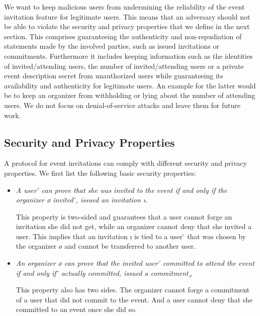 We want to keep malicious users from undermining the reliability of the
event invitation feature for legitimate users. This means that an
adversary should not be able to violate the security and privacy
properties that we define in the next section. 
This comprises guaranteeing the authenticity and non-repudiation of
statements made by the involved parties, such as issued invitations or
commitments. 
Furthermore it includes keeping information such as the identities of
invited/attending users, the number of invited/attending users or a
private event description secret from unauthorized users while
guaranteeing its availability and authenticity for legitimate users.
An example for the latter would be to keep an organizer 
from withholding or lying about the number of attending users.
%
We do not focus on denial-of-service attacks and leave
them for future work.

\subsection{Security and Privacy Properties}
	\label{subsection:event-invitations-dosns:security-properties}
A protocol for event invitations can comply with different security and
privacy properties. We first list the following basic security properties:

\begin{itemize}
	
	\item \textit{A user \u{} can prove that she was invited to the
					event \e{} if and only if the organizer
					\o{} invited \u{}, \ie issued an
					invitation \i{}.} 

	This property is two-sided and guarantees that a user cannot forge
	an invitation she did not get, while an organizer cannot deny that
	she invited a user. 
	This implies that an invitation \i{} is tied to a user \u{} that was
	chosen by the organizer \o{} and cannot be transferred to another user.\\

	
	\item \textit{An organizer \o{} can prove that the invited 
		user \u{} committed to attend the event \e{} if and only if \u{}
		actually committed, \ie issued a commitment \c{}.}

	This property also has two sides. The organizer cannot forge a commitment
	of a user that did not commit to the event. And a user cannot deny
	that she committed to an event once she did so.

\end{itemize}

